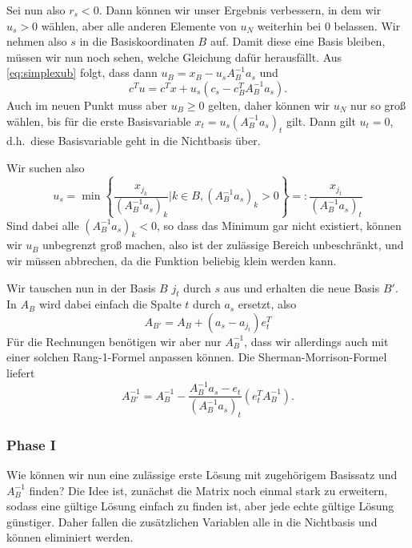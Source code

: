 Sei nun also $r_s< 0$. Dann können wir unser Ergebnis verbessern, in
dem wir $u_s>0$ wählen, aber alle anderen Elemente von $u_N$ weiterhin
bei 0 belassen. Wir nehmen also $s$ in die Basiskoordinaten $B$
auf. Damit diese eine Basis bleiben, müssen wir nun noch sehen, welche
Gleichung dafür herausfällt. Aus \eqref{eq:simplexub} folgt, dass dann
$u_B = x_B - u_s A_B^{-1}a_s$ und
\begin{equation}
  \label{eq:simplextgt}
  c^Tu = c^Tx + u_s(c_s - c_B^T A_B^{-1}a_s).
\end{equation}
Auch im neuen Punkt muss aber $u_B\ge
0$ gelten, daher können wir $u_N$ nur so groß wählen, bis für die erste
Basisvariable $x_t= u_s (A_B^{-1}a_s)_t$ gilt. Dann gilt $u_t=0$,
d.h.\ diese Basisvariable geht in die Nichtbasis über.

Wir suchen also
\begin{equation}
  u_s = \min \left\{\frac{x_{j_k}}{(A_B^{-1}a_s)_k} | k\in B,
      (A_B^{-1}a_s)_k > 0\right\} =:
  \frac{x_{j_t}}{(A_B^{-1}a_s)_t}
\end{equation}
Sind dabei alle $(A_B^{-1}a_s)_k < 0$, so dass das Minimum gar nicht
existiert, können wir $u_B$ unbegrenzt groß machen, also ist der
zulässige Bereich unbeschränkt, und wir müssen abbrechen, da die
Funktion beliebig klein werden kann.

Wir tauschen nun in der Basis $B$ $j_t$ durch $s$ aus und erhalten die
neue Basis $B'$. In $A_B$ wird dabei einfach die Spalte $t$ durch
$a_s$ ersetzt, also
\begin{equation}
  A_{B'} = A_B + (a_s - a_{j_t})e_t^T
\end{equation}
Für die Rechnungen benötigen wir aber nur $A_B^{-1}$, dass wir
allerdings auch mit einer solchen Rang-1-Formel anpassen können. Die
Sherman-Morrison-Formel liefert
\begin{equation}
  \label{eq:simplexex}
  A_{B'}^{-1} = A_{B}^{-1} - \frac{A_B^{-1}a_s - e_t}{(A_B^{-1}a_s)_t}
  \left(e_t^TA_{B}^{-1}\right).
\end{equation}

\subsubsection*{Phase I}

Wie können wir nun eine zulässige erste Lösung mit zugehörigem
Basissatz und $A_B^{-1}$ finden? Die Idee ist, zunächst die Matrix
noch einmal stark zu erweitern, sodass eine gültige Lösung einfach zu
finden ist, aber jede echte gültige Lösung günstiger. Daher fallen die
zusätzlichen Variablen alle in die Nichtbasis und können eliminiert
werden.

